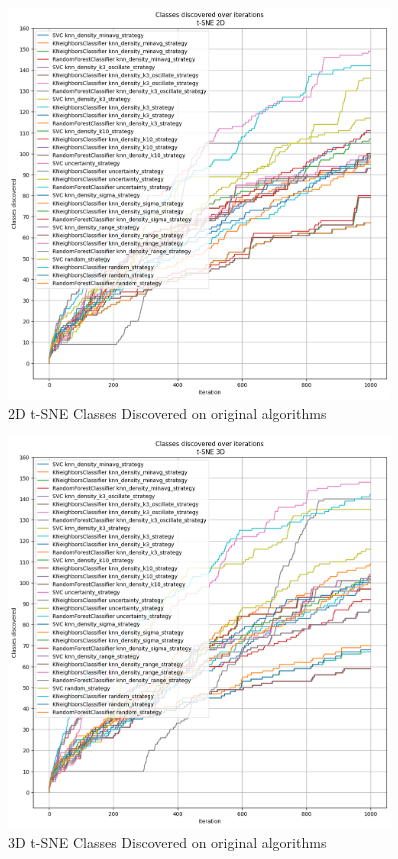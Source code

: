 \begin{figure}[htbp]
    \centering
    \includegraphics[width=0.9\textwidth]{resources/images/classes_discovered_tsne_2d.png}
    \caption{2D t-SNE Classes Discovered on original algorithms}
\end{figure}

\begin{figure}[htbp]
    \centering
    \includegraphics[width=0.9\textwidth]{resources/images/classes_discovered_tsne_3d.png}
    \caption{3D t-SNE Classes Discovered on original algorithms}
    \label{fig:classes_discovered_end}
\end{figure}



